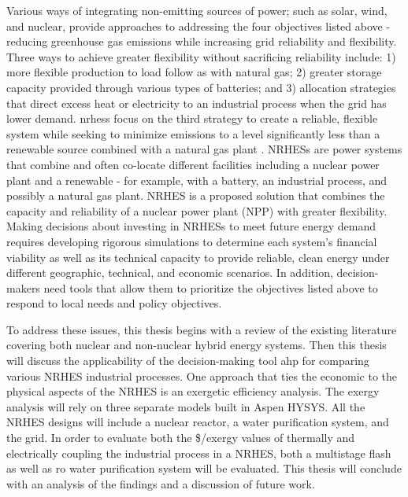 \documentclass[12pt]{UIdahoMastersThesis}
\begin{document}
Various ways of integrating non-emitting sources of power; such as solar, wind, and nuclear, provide approaches to addressing the four objectives listed above - reducing greenhouse gas emissions while increasing grid reliability and flexibility. Three ways to achieve greater flexibility without sacrificing reliability include: 1) more flexible production to load follow as with natural gas; 2) greater storage capacity provided through various types of batteries; and 3)  allocation strategies that direct excess heat or electricity to an industrial process when the grid has lower demand. \ac{nrhess} focus on the third strategy to create a reliable, flexible system while seeking to minimize emissions to a level significantly less than a renewable source combined with a natural gas plant \cite{Baker2016}. NRHESs are power systems that combine and often co-locate different facilities including a nuclear power plant and a renewable - for example, with a battery, an industrial process, and possibly a natural gas plant.  NRHES is a proposed solution that combines the capacity and reliability of a nuclear power plant (NPP) with greater flexibility. 
Making decisions about investing in NRHESs to meet future energy demand requires developing rigorous simulations to determine each system's financial viability as well as its technical capacity to provide reliable, clean energy under different geographic, technical, and economic scenarios. In addition, decision-makers need tools that allow them to prioritize the objectives listed above to respond to local needs and policy objectives. 


To address these issues, this thesis begins with a review of the existing literature covering both nuclear and non-nuclear hybrid energy systems.  Then this thesis will discuss the applicability of the decision-making tool \ac{ahp} for comparing various NRHES industrial processes. One approach that ties the economic to the physical aspects of the NRHES is an exergetic efficiency analysis. The exergy analysis will rely on three separate models built in Aspen HYSYS. All the NRHES designs will include a nuclear reactor, a water purification system, and the grid. In order to evaluate both the \$/exergy values of thermally and electrically coupling the industrial process in a NRHES, both a multistage flash as well as \ac{ro} water purification system will be evaluated.  This thesis will conclude with an analysis of the findings and a discussion of future work.
\end{document}
